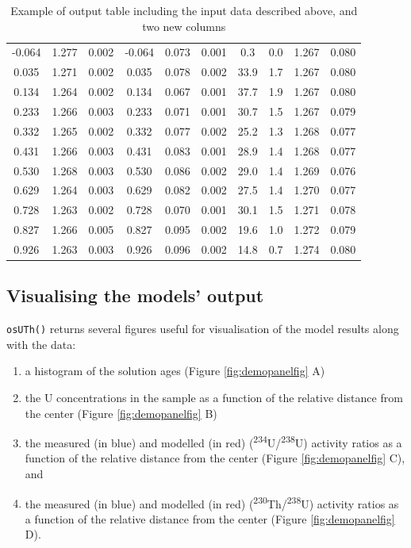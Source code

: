 \documentclass[]{elsarticle} %
\providecommand{\tightlist}{%
  \setlength{\itemsep}{0pt}\setlength{\parskip}{0pt}}
\begin{document}
\begin{table}[ht]
\begin{tabular}{cccccccccc}
  -0.064 & 1.277 & 0.002 & -0.064 & 0.073 & 0.001 & 0.3 & 0.0 & 1.267 & 0.080 \\ 
  0.035 & 1.271 & 0.002 & 0.035 & 0.078 & 0.002 & 33.9 & 1.7 & 1.267 & 0.080 \\ 
  0.134 & 1.264 & 0.002 & 0.134 & 0.067 & 0.001 & 37.7 & 1.9 & 1.267 & 0.080 \\ 
  0.233 & 1.266 & 0.003 & 0.233 & 0.071 & 0.001 & 30.7 & 1.5 & 1.267 & 0.079 \\ 
  0.332 & 1.265 & 0.002 & 0.332 & 0.077 & 0.002 & 25.2 & 1.3 & 1.268 & 0.077 \\ 
  0.431 & 1.266 & 0.003 & 0.431 & 0.083 & 0.001 & 28.9 & 1.4 & 1.268 & 0.077 \\ 
  0.530 & 1.268 & 0.003 & 0.530 & 0.086 & 0.002 & 29.0 & 1.4 & 1.269 & 0.076 \\ 
  0.629 & 1.264 & 0.003 & 0.629 & 0.082 & 0.002 & 27.5 & 1.4 & 1.270 & 0.077 \\ 
  0.728 & 1.263 & 0.002 & 0.728 & 0.070 & 0.001 & 30.1 & 1.5 & 1.271 & 0.078 \\ 
  0.827 & 1.266 & 0.005 & 0.827 & 0.095 & 0.002 & 19.6 & 1.0 & 1.272 & 0.079 \\ 
  0.926 & 1.263 & 0.003 & 0.926 & 0.096 & 0.002 & 14.8 & 0.7 & 1.274 & 0.080 \\ 
   \hline
\end{tabular}
\caption{\label{tab:outputdata}Example of output table including the input data described above, and two new columns} 
\end{table}

\hypertarget{visualising-the-models-output}{%
\subsection{Visualising the models' output}\label{visualising-the-models-output}}

\texttt{osUTh()} returns several figures useful for visualisation of the model results along with the data:

\begin{enumerate}
\def\labelenumi{\arabic{enumi}.}
\tightlist
\item
  a histogram of the solution ages (Figure \ref{fig:demopanelfig} A)
\item
  the U concentrations in the sample as a function of the relative distance from the center (Figure \ref{fig:demopanelfig} B)
\item
  the measured (in blue) and modelled (in red) (\textsuperscript{234}U/\textsuperscript{238}U) activity ratios as a function of the relative distance from the center (Figure \ref{fig:demopanelfig} C), and
\item
  the measured (in blue) and modelled (in red) (\textsuperscript{230}Th/\textsuperscript{238}U) activity ratios as a function of the relative distance from the center (Figure \ref{fig:demopanelfig} D).
\end{enumerate}
\end{document}
